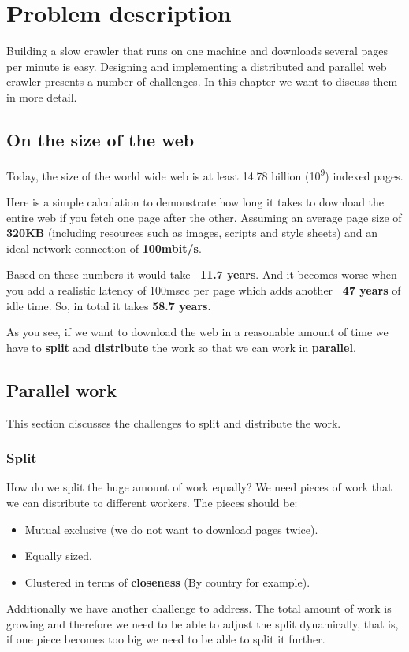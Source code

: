 \chapter{Problem description} %
Building a slow crawler that runs on one machine and downloads several pages per minute is easy. Designing and implementing a distributed and parallel web crawler presents a number of challenges. In this chapter we want to discuss them in more detail.

\label{Chapter3} %


\section{On the size of the web}
Today, the size of the world wide web is at least 14.78 billion (10\textsuperscript{9}) indexed pages.\cite{wwwsize}

Here is a simple calculation to demonstrate how long it takes to download the entire web if you fetch one page after the other.
Assuming an average page size of \textbf{320KB} \cite{webmetrics} (including resources such as images, scripts and style sheets) and an ideal network connection of \textbf{100mbit/s}.

Based on these numbers it would take \textbf{~11.7 years}. And it becomes worse when you add a realistic latency of 100msec per page which adds another \textbf{~47 years} of idle time. So, in total it takes \textbf{58.7 years}.

As you see, if we want to download the web in a reasonable amount of time we have to \textbf{split} and \textbf{distribute} the work so that we can work in \textbf{parallel}.

\section{Parallel work}
This section discusses the challenges to split and distribute the work.
\subsection{Split}
How do we split the huge amount of work equally? We need pieces of work that we can distribute to different workers. The pieces should be:
\begin{itemize}
\item Mutual exclusive (we do not want to download pages twice).
\item Equally sized.
\item Clustered in terms of \textbf{closeness} (By country for example).
\end{itemize}
Additionally we have another challenge to address. The total amount of work is growing and therefore we need to be able to adjust the split dynamically, that is, if one piece becomes too big we need to be able to split it further.
